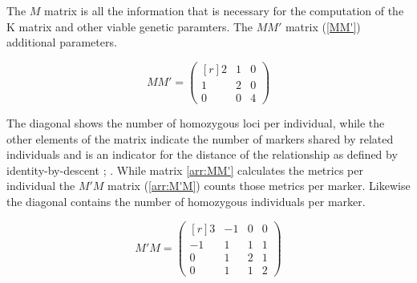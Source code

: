 The $M$ matrix is all the information that is necessary for the computation of the K matrix and other viable genetic paramters. The $MM'$ matrix (\ref{MM'}) additional parameters.

\begin{equation}
  MM' = 
  \begin{pmatrix}[r]
    2 &  1 & 0 \\
    1 &  2 & 0 \\
    0 &  0 & 4 
  \end{pmatrix}
  \label{arr:MM'}
\end{equation}


The diagonal shows the number of homozygous loci per individual, while the other elements of the matrix
indicate the number of markers shared by related individuals and is an indicator for the distance of the
relationship as defined by identity-by-descent \cite{vanraden2008efficient}; \cite{misztal2013methods}.
While matrix \ref{arr:MM'} calculates the metrics per individual the $M'M$ matrix (\ref{arr:M'M}) counts those metrics per marker. Likewise the diagonal contains the number of homozygous individuals per marker.

\begin{equation}
  M'M = 
  \begin{pmatrix}[r]
    3 & -1 & 0 & 0 \\
   -1 &  1 & 1 & 1 \\
    0 &  1 & 2 & 1 \\
    0 &  1 & 1 & 2 
  \end{pmatrix}
  \label{arr:M'M}
\end{equation}




